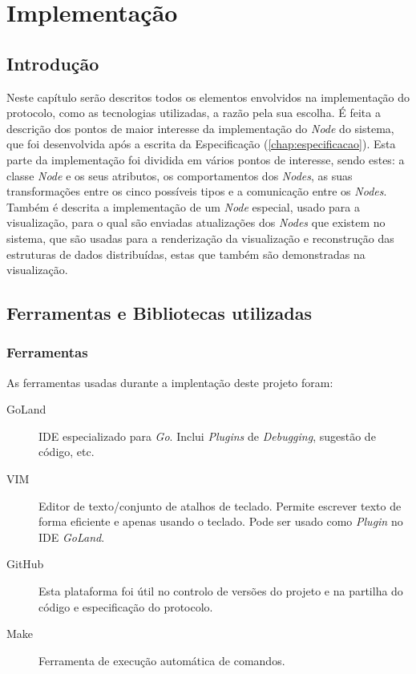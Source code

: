 \chapter{Implementação}
\label{chap:implementacao}

\section{Introdução}
\label{implementacao:sec:introducao}

Neste capítulo serão descritos todos os elementos envolvidos na implementação do protocolo,
como as tecnologias utilizadas, a razão pela sua escolha. É feita a descrição dos pontos de maior interesse da implementação do \emph{Node} do sistema, que foi desenvolvida após a escrita da Especificação (\ref{chap:especificacao}). 
Esta parte da implementação foi dividida em vários pontos de interesse, sendo estes: a classe \emph{Node} e os seus atributos, os comportamentos dos \emph{Nodes}, as suas transformações entre os cinco possíveis tipos e a comunicação entre os \emph{Nodes}.
Também é descrita a implementação de um \emph{Node} especial, usado para a visualização, para o qual são enviadas atualizações dos \emph{Nodes} que existem no sistema, que são usadas para a renderização da visualização e reconstrução das estruturas de dados distribuídas, estas que também são demonstradas na visualização.


\section{Ferramentas e Bibliotecas utilizadas}
\label{implementacao:sec:ferramentas_bibliotecas}
\subsection*{Ferramentas}
As ferramentas usadas durante a implentação deste projeto foram:
\begin{description}
    \item [GoLand] \acs{IDE} especializado para \emph{Go}. Inclui \emph{Plugins} de \emph{Debugging}, sugestão de código, etc.
    \item [VIM] Editor de texto/conjunto de atalhos de teclado. Permite escrever texto de forma eficiente e apenas usando o teclado. Pode ser usado como \emph{Plugin} no \acs{IDE} \emph{GoLand}.
    \item [GitHub] Esta plataforma foi útil no controlo de versões do projeto e na partilha do código e especificação do protocolo.
    \item [Make] Ferramenta de execução automática de comandos.
\end{description}

